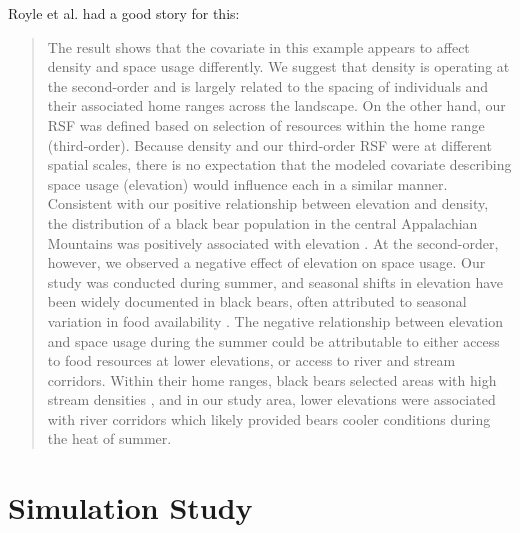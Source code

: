 Royle et al. had a good story for this:
\begin{quote}
The result shows that 
the covariate in this example appears to affect
 density and space usage
differently.  We suggest that density is operating at the second-order
and is largely related to the spacing of individuals and their
associated home ranges across the landscape.  On the other hand, our RSF was defined
based on selection of resources within the home range (third-order).
Because density and our third-order RSF were at different spatial
scales, there is no expectation that the modeled covariate describing
space usage (elevation) would influence each in a similar manner.
Consistent with our positive relationship between elevation and
density, the distribution of a black bear population in the central
Appalachian Mountains was positively associated with elevation \citep{frary_etal:2011}.
 At the second-order, however, we observed a negative
effect of elevation on space usage.  Our study was conducted during
summer, and seasonal shifts in elevation have been widely documented
in black bears, often attributed to seasonal variation in food
availability \citep{reynolds_beecham:1980,
graber_white:1983}.
 The negative relationship between elevation and space
usage during the summer could be attributable to either access to food
resources at lower elevations, or access to river and stream
corridors.  Within their home ranges, black bears selected areas with
high stream densities \citep{fecske_etal:2002}, and in our study area,
lower elevations were associated with river corridors which likely
provided bears cooler conditions during the heat of summer.
\end{quote}



\section{Simulation Study}

